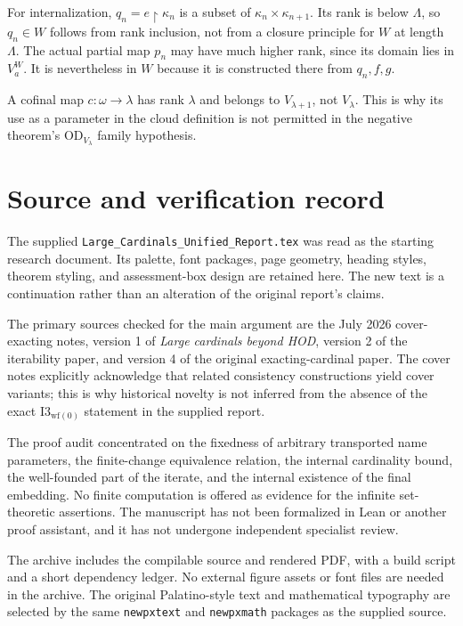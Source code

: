 \documentclass[11pt,letterpaper]{article}
\theoremstyle{definition}
\newcommand{\OD}{\mathrm{OD}}
\newcommand{\restr}{\mathbin{\upharpoonright}}
\newcommand{\Iwf}{\mathrm{I3}_{\mathrm{wf}(0)}}
\begin{document}
For internalization, $q_n=e\restr\kappa_n$ is a subset of
$\kappa_n\times\kappa_{n+1}$. Its rank is below $\Lambda$, so
$q_n\in W$ follows from rank inclusion, not from a closure principle
for $W$ at length $\Lambda$. The actual partial map $p_n$ may have
much higher rank, since its domain lies in $V_a^W$. It is nevertheless
in $W$ because it is constructed there from $q_n,f,g$.

A cofinal map $c:\omega\to\lambda$ has rank $\lambda$ and belongs
to $V_{\lambda+1}$, not $V_\lambda$. This is why its use as a parameter
in the cloud definition is not permitted in the negative theorem's
$\OD_{V_\lambda}$ family hypothesis.

\section{Source and verification record}\label{app:verification}

The supplied \texttt{Large\_Cardinals\_Unified\_Report.tex} was read as
the starting research document. Its palette, font packages, page geometry,
heading styles, theorem styling, and assessment-box design are retained
here. The new text is a continuation rather than an alteration of the
original report's claims.

The primary sources checked for the main argument are the July 2026
cover-exacting notes, version 1 of \emph{Large cardinals beyond HOD},
version 2 of the iterability paper, and version 4 of the original
exacting-cardinal paper. The cover notes explicitly acknowledge that
related consistency constructions yield cover variants; this is why
historical novelty is not inferred from the absence of the exact
$\Iwf$ statement in the supplied report.

The proof audit concentrated on the fixedness of arbitrary transported
name parameters, the finite-change equivalence relation, the internal
cardinality bound, the well-founded part of the iterate, and the internal
existence of the final embedding. No finite computation is offered as
evidence for the infinite set-theoretic assertions. The manuscript has
not been formalized in Lean or another proof assistant, and it has not
undergone independent specialist review.

The archive includes the compilable source and rendered PDF, with a
build script and a short dependency ledger. No external figure assets or
font files are needed in the archive. The original Palatino-style text
and mathematical typography are selected by the same \texttt{newpxtext}
and \texttt{newpxmath} packages as the supplied source.
\end{document}
